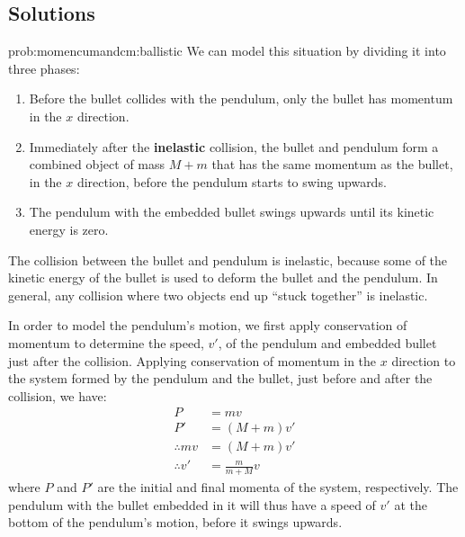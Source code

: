 \newpage
\subsection{Solutions}
\begin{solution}{prob:momencumandcm:ballistic}\label{soln:momentumandcm:ballistic}
We can model this situation by dividing it into three phases:
\begin{enumerate}
\item Before the bullet collides with the pendulum, only the bullet has momentum in the $x$ direction.
\item Immediately after the \textbf{inelastic} collision, the bullet and pendulum form a combined object of mass $M+m$ that has the same momentum as the bullet, in the $x$ direction, before the pendulum starts to swing upwards.
\item The pendulum with the embedded bullet swings upwards until its kinetic energy is zero.
\end{enumerate}
The collision between the bullet and pendulum is inelastic, because some of the kinetic energy of the bullet is used to deform the bullet and the pendulum. In general, any collision where two objects end up ``stuck together'' is inelastic.

In order to model the pendulum's motion, we first apply conservation of momentum to determine the speed, $v'$, of the pendulum and embedded bullet just after the collision. Applying conservation of momentum in the $x$ direction to the system formed by the pendulum and the bullet, just before and after the collision, we have:
\begin{align*}
P &= mv\\
P' &= (M+m)v'\\
\therefore mv &= (M+m)v'\\
\therefore v' &= \frac{m}{m+M}v
\end{align*}
where $P$ and $P'$ are the initial and final momenta of the system, respectively. The pendulum with the bullet embedded in it will thus have a speed of $v'$ at the bottom of the pendulum's motion, before it swings upwards. 


\end{solution}
